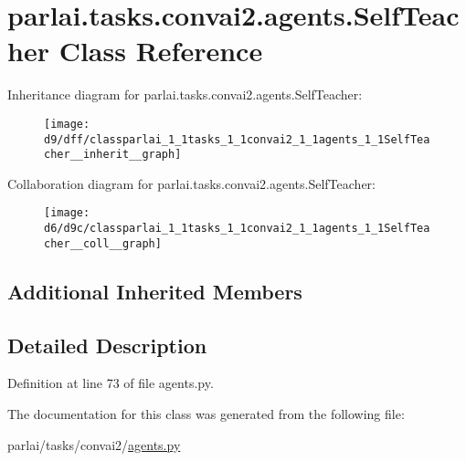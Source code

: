 \hypertarget{classparlai_1_1tasks_1_1convai2_1_1agents_1_1SelfTeacher}{}\section{parlai.\+tasks.\+convai2.\+agents.\+Self\+Teacher Class Reference}
\label{classparlai_1_1tasks_1_1convai2_1_1agents_1_1SelfTeacher}


Inheritance diagram for parlai.\+tasks.\+convai2.\+agents.\+Self\+Teacher\+:\nopagebreak
\begin{figure}[H]
\begin{center}
\leavevmode
\texttt{[image: d9/dff/classparlai\_1\_1tasks\_1\_1convai2\_1\_1agents\_1\_1SelfTeacher\_\_inherit\_\_graph]}
\end{center}
\end{figure}


Collaboration diagram for parlai.\+tasks.\+convai2.\+agents.\+Self\+Teacher\+:\nopagebreak
\begin{figure}[H]
\begin{center}
\leavevmode
\texttt{[image: d6/d9c/classparlai\_1\_1tasks\_1\_1convai2\_1\_1agents\_1\_1SelfTeacher\_\_coll\_\_graph]}
\end{center}
\end{figure}
\subsection*{Additional Inherited Members}


\subsection{Detailed Description}


Definition at line 73 of file agents.\+py.



The documentation for this class was generated from the following file\+:\begin{DoxyCompactItemize}
\item 
parlai/tasks/convai2/\hyperlink{parlai_2tasks_2convai2_2agents_8py}{agents.\+py}\end{DoxyCompactItemize}
